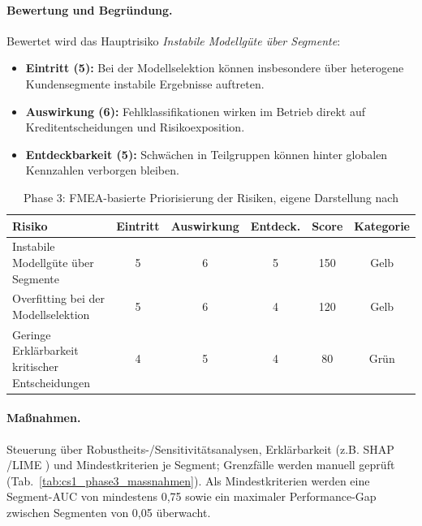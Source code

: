 \paragraph*{Bewertung und Begründung.}
Bewertet wird das Hauptrisiko \textit{Instabile Modellgüte über Segmente}:
\begin{itemize}
  \item \textbf{Eintritt (5):} Bei der Modellselektion können insbesondere über heterogene Kundensegmente instabile Ergebnisse auftreten.
  \item \textbf{Auswirkung (6):} Fehlklassifikationen wirken im Betrieb direkt auf Kreditentscheidungen und Risikoexposition.
  \item \textbf{Entdeckbarkeit (5):} Schwächen in Teilgruppen können hinter globalen Kennzahlen verborgen bleiben.
\end{itemize}

\begin{table}[!htbp]
\centering
\begin{tabular}{|p{5.5cm}|c|c|c|c|c|}
\hline
\textbf{Risiko} & \textbf{Eintritt} & \textbf{Auswirkung} & \textbf{Entdeck.} & \textbf{Score} & \textbf{Kategorie} \\
\hline
Instabile Modellgüte über Segmente & 5 & 6 & 5 & 150 & Gelb \\
Overfitting bei der Modellselektion & 5 & 6 & 4 & 120 & Gelb \\
Geringe Erklärbarkeit kritischer Entscheidungen & 4 & 5 & 4 & 80 & Grün \\
\hline
\end{tabular}
\caption{Phase 3: FMEA-basierte Priorisierung der Risiken, eigene Darstellung nach \cite{Bundesministerium_2018}}
\label{tab:cs1_phase3_risiken}
\end{table}

\paragraph*{Maßnahmen.}
Steuerung über Robustheits-/Sensitivitätsanalysen, Erklärbarkeit (z.B. SHAP \cite{lundberg_unified_2017}/LIME \cite{ribeiro_why_2016})
und Mindestkriterien je Segment; Grenzfälle werden manuell geprüft (Tab.~\ref{tab:cs1_phase3_massnahmen}).
Als Mindestkriterien werden eine Segment-AUC von mindestens 0{,}75 sowie ein maximaler Performance-Gap zwischen Segmenten von 0{,}05 überwacht.

